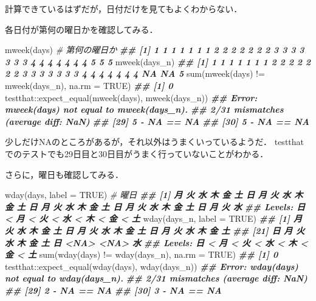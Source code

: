 \documentclass[
]{article}
\newenvironment{Shaded}{\begin{snugshade}}{\end{snugshade}}
\newcommand{\AttributeTok}[1]{\textcolor[rgb]{0.77,0.63,0.00}{#1}}
\newcommand{\CommentTok}[1]{\textcolor[rgb]{0.56,0.35,0.01}{\textit{#1}}}
\newcommand{\ConstantTok}[1]{\textcolor[rgb]{0.00,0.00,0.00}{#1}}
\newcommand{\DocumentationTok}[1]{\textcolor[rgb]{0.56,0.35,0.01}{\textbf{\textit{#1}}}}
\newcommand{\FunctionTok}[1]{\textcolor[rgb]{0.00,0.00,0.00}{#1}}
\newcommand{\NormalTok}[1]{#1}
\newcommand{\SpecialCharTok}[1]{\textcolor[rgb]{0.00,0.00,0.00}{#1}}
\begin{document}
計算できているはずだが，日付だけを見てもよくわからない．

各日付が第何の曜日かを確認してみる．

\begin{Shaded}
\begin{Highlighting}[]
\FunctionTok{mweek}\NormalTok{(days)   }\CommentTok{\# 第何の曜日か}
\DocumentationTok{\#\# [1] 1 1 1 1 1 1 1 2 2 2 2 2 2 2 3 3 3 3 3 3 3 4 4 4 4 4 4 4 5 5 5}
\FunctionTok{mweek}\NormalTok{(days\_n)}
\DocumentationTok{\#\# [1]  1  1  1  1  1  1  1  2  2  2  2  2  2  2  3  3  3  3  3  3  3  4  4  4  4  4  4  4 NA NA  5}
\FunctionTok{sum}\NormalTok{(}\FunctionTok{mweek}\NormalTok{(days) }\SpecialCharTok{!=} \FunctionTok{mweek}\NormalTok{(days\_n), }\AttributeTok{na.rm =} \ConstantTok{TRUE}\NormalTok{)}
\DocumentationTok{\#\# [1] 0}
\NormalTok{testthat}\SpecialCharTok{::}\FunctionTok{expect\_equal}\NormalTok{(}\FunctionTok{mweek}\NormalTok{(days), }\FunctionTok{mweek}\NormalTok{(days\_n))}
\DocumentationTok{\#\# Error: mweek(days) not equal to mweek(days\_n).}
\DocumentationTok{\#\# 2/31 mismatches (average diff: NaN)}
\DocumentationTok{\#\# [29] 5 {-} NA == NA}
\DocumentationTok{\#\# [30] 5 {-} NA == NA}
\end{Highlighting}
\end{Shaded}

少しだけNAのところがあるが，それ以外はうまくいっているようだ．
testthatでのテストでも29日目と30日目がうまく行っていないことがわかる．

さらに，曜日も確認してみる．

\begin{Shaded}
\begin{Highlighting}[]
\FunctionTok{wday}\NormalTok{(days, }\AttributeTok{label =} \ConstantTok{TRUE}\NormalTok{)   }\CommentTok{\# 曜日}
\DocumentationTok{\#\#  [1] 月 火 水 木 金 土 日 月 火 水 木 金 土 日 月 火 水 木 金 土 日 月 火 水 木 金 土 日 月 火 水}
\DocumentationTok{\#\# Levels: 日 \textless{} 月 \textless{} 火 \textless{} 水 \textless{} 木 \textless{} 金 \textless{} 土}
\FunctionTok{wday}\NormalTok{(days\_n, }\AttributeTok{label =} \ConstantTok{TRUE}\NormalTok{)}
\DocumentationTok{\#\#  [1] 月   火   水   木   金   土   日   月   火   水   木   金   土   日   月   火   水   木   金   土  }
\DocumentationTok{\#\# [21] 日   月   火   水   木   金   土   日   \textless{}NA\textgreater{} \textless{}NA\textgreater{} 水  }
\DocumentationTok{\#\# Levels: 日 \textless{} 月 \textless{} 火 \textless{} 水 \textless{} 木 \textless{} 金 \textless{} 土}
\FunctionTok{sum}\NormalTok{(}\FunctionTok{wday}\NormalTok{(days) }\SpecialCharTok{!=} \FunctionTok{wday}\NormalTok{(days\_n), }\AttributeTok{na.rm =} \ConstantTok{TRUE}\NormalTok{)}
\DocumentationTok{\#\# [1] 0}
\NormalTok{testthat}\SpecialCharTok{::}\FunctionTok{expect\_equal}\NormalTok{(}\FunctionTok{wday}\NormalTok{(days), }\FunctionTok{wday}\NormalTok{(days\_n))}
\DocumentationTok{\#\# Error: wday(days) not equal to wday(days\_n).}
\DocumentationTok{\#\# 2/31 mismatches (average diff: NaN)}
\DocumentationTok{\#\# [29] 2 {-} NA == NA}
\DocumentationTok{\#\# [30] 3 {-} NA == NA}
\end{Highlighting}
\end{Shaded}
\end{document}
